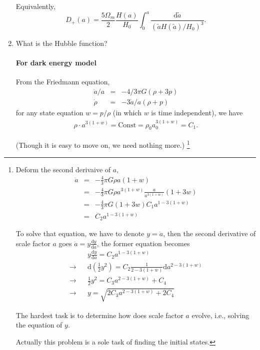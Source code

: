 \documentclass{article}
\begin{document}
\begin{enumerate}
Equivalently, 
\begin{equation}
D_+(a)=\frac{5\Omega_m}{2}\frac{H(a)}{H_0}\int^a_0 \frac{\mathrm d \tilde{a}}{(\tilde a H(\tilde a)/H_0)^3}  .
\end{equation}



\item
What is the Hubble function?
\paragraph{For dark energy model} 
From the Friedmann equation, 
\begin{eqnarray}
\ddot a/a&=&-4/3\pi G(\rho+3p) \\
\dot \rho&=&-3\dot a/a(\rho+p)
\end{eqnarray}
for any state equation $w=p/\rho$ (in which $w$ is time independent), we have 
\begin{eqnarray}
\rho\cdot a^{3(1+w)}=\text{Const}=\rho_0 a_0^{3(1+w)}=C_1.
\end{eqnarray}

(Though it is easy to move on, we need nothing more.)
\footnote{Deform the second derivaive of $a$, 
\begin{eqnarray}
\ddot a&=&-\frac 4 3 \pi G \rho a (1+w) \\
&=&-\frac 4 3 \pi G \rho a^{3(1+w)}\frac{a}{a^{3(1+w)}} (1+3w) \\
&=&-\frac 4 3 \pi G (1+3w) C_1 a^{1-3(1+w)} \\
&=&C_2 a^{1-3(1+w)}
\end{eqnarray}

To solve that equation, we have to denote $y=\dot a$, then the second derivative of scale factor $a$ goes $\ddot a=y \frac{\mathrm d y}{\mathrm d a}$, the former equation becomes
\begin{eqnarray}
&&y\frac{\mathrm d y}{\mathrm da}=C_2a^{1-3(1+w)}\\
\rightarrow && \mathrm d (\frac 1 2 y^2)= C_2 \frac 1 {2-3(1+w)} \mathrm d a^{2-3(1+w)} \\
\rightarrow && \frac 1 2 y^2=C_3a^{2-3(1+w)}+C_4 \\
\rightarrow && y=\sqrt{ 2C_3 a^{2-3(1+w)} +2 C_4 }
\end{eqnarray}
																			
The hardest task is to determine how does scale factor $a$ evolve, i.e., solving the equation of $y$.

Actually this problem is a sole task of finding the initial states.}



\end{enumerate}
\end{document}
